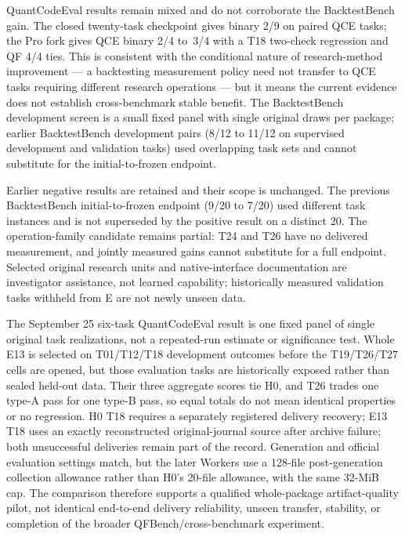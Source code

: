 QuantCodeEval results remain mixed and do not corroborate the BacktestBench
gain.  The closed twenty-task checkpoint gives binary 2/9 on paired QCE tasks;
the Pro \Evolver{} fork gives QCE binary 2/4 to~3/4 with a T18 two-check
regression and QF 4/4 ties.  This is consistent with the conditional nature
of research-method improvement --- a backtesting measurement policy need not
transfer to QCE tasks requiring different research operations --- but it means
the current evidence does not establish cross-benchmark stable benefit.  The
BacktestBench development screen is a small fixed panel with single original
draws per package; earlier BacktestBench development pairs (8/12 to 11/12
on supervised development and validation tasks) used overlapping task sets
and cannot substitute for the initial-to-frozen endpoint.

Earlier negative results are retained and their scope is unchanged.  The
previous BacktestBench initial-to-frozen endpoint (9/20 to 7/20) used different
task instances and is not superseded by the positive result on a distinct 20.
The operation-family candidate remains partial: T24 and T26 have no delivered
measurement, and jointly measured gains cannot substitute for a full endpoint.
Selected original research units and native-interface documentation are
investigator assistance, not learned capability; historically measured
validation tasks withheld from E are not newly unseen data.

The September 25 six-task QuantCodeEval result is one fixed panel of single
original task realizations, not a repeated-run estimate or significance test.
Whole E13 is selected on T01/T12/T18 development outcomes before the
T19/T26/T27 cells are opened, but those evaluation tasks are historically
exposed rather than sealed held-out data. Their three aggregate scores tie H0,
and T26 trades one type-A pass for one type-B pass, so equal totals do not mean
identical properties or no regression. H0 T18 requires a separately registered
delivery recovery; E13 T18 uses an exactly reconstructed original-journal
source after archive failure; both unsuccessful deliveries remain part of the
record. Generation and official evaluation settings match, but the later
Workers use a 128-file post-generation collection allowance rather than H0's
20-file allowance, with the same 32-MiB cap. The comparison therefore supports
a qualified whole-package artifact-quality pilot, not identical end-to-end
delivery reliability, unseen transfer, stability, or completion of the broader
QFBench/cross-benchmark experiment.

